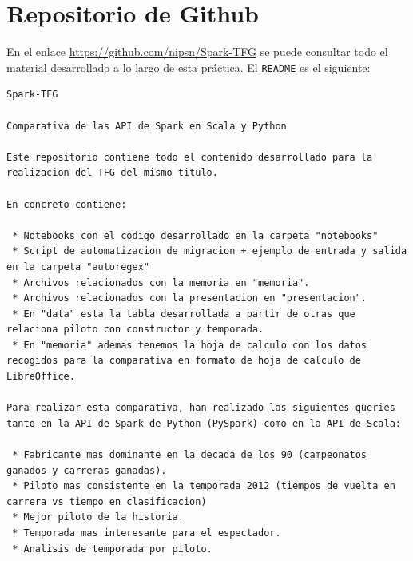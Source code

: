 \documentclass[12pt,twoside,titlepage]{report}
\begin{document}
\chapter{Repositorio de Github}
\label{repo}

En el enlace \url{https://github.com/nipsn/Spark-TFG} se puede consultar todo el material desarrollado a lo largo de esta práctica. El \texttt{README} es el siguiente:

\begin{lstlisting}
Spark-TFG

Comparativa de las API de Spark en Scala y Python

Este repositorio contiene todo el contenido desarrollado para la realizacion del TFG del mismo titulo.

En concreto contiene:

 * Notebooks con el codigo desarrollado en la carpeta "notebooks"
 * Script de automatizacion de migracion + ejemplo de entrada y salida en la carpeta "autoregex"
 * Archivos relacionados con la memoria en "memoria".
 * Archivos relacionados con la presentacion en "presentacion".
 * En "data" esta la tabla desarrollada a partir de otras que relaciona piloto con constructor y temporada.
 * En "memoria" ademas tenemos la hoja de calculo con los datos recogidos para la comparativa en formato de hoja de calculo de LibreOffice.

Para realizar esta comparativa, han realizado las siguientes queries tanto en la API de Spark de Python (PySpark) como en la API de Scala:

 * Fabricante mas dominante en la decada de los 90 (campeonatos ganados y carreras ganadas).
 * Piloto mas consistente en la temporada 2012 (tiempos de vuelta en carrera vs tiempo en clasificacion)
 * Mejor piloto de la historia.
 * Temporada mas interesante para el espectador.
 * Analisis de temporada por piloto.

\end{lstlisting}



\end{document}
